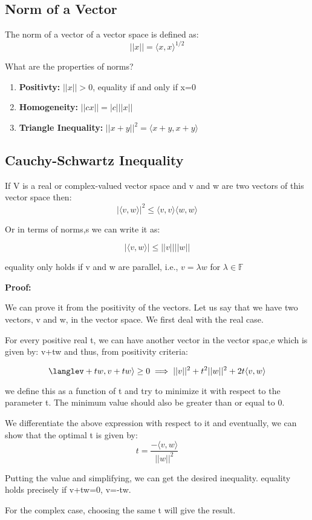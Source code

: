  \subsection{Norm of a Vector}

 The norm of a vector of a vector space is defined as: $$||x||=\langle x,x \rangle ^{1/2}$$

 What are the properties of norms?

 \begin{enumerate}
     \item \textbf{Positivty:} $||x||>0$, equality if and only if x=0
     \item \textbf{Homogeneity:} $||cx||=|c|||x||$
     \item \textbf{Triangle Inequality:} $||x+y||^2=\langle x+y, x+y \rangle$
 \end{enumerate}

 \subsection{Cauchy-Schwartz Inequality}

 If V is a real or complex-valued vector space and v and w are two vectors of this vector space then: $$|\langle v,w\rangle|^2 \leq \langle v,v\rangle \langle w,w \rangle$$

 Or in terms of norms,s we can write it as:

$$|\langle v,w\rangle| \leq ||v|| ||w||$$

equality only holds if v and w are parallel, i.e., $v=\lambda w$ for $\lambda \in \mathbb{F}$
 

 \textbf{Proof:}

We can prove it from the positivity of the vectors. Let us say that we have two vectors, v 
 and w, in the vector space. We first deal with the real case.

 For every positive real t, we can have another vector in the vector spac,e which is given by:
 v+tw and thus, from positivity criteria:

 $$\langlev+tw , v+tw \rangle\geq 0 \implies ||v||^2 + t^2||w||^2 + 2t\langle v,w \rangle $$

 we define this as a function of t and try to minimize it with respect to the parameter t. The minimum value should also be greater than or equal to 0.

 We differentiate the above expression with respect to it and eventually, we can show that the optimal t is given by: 
 $$t = \frac{-\langle v ,w \rangle}{||w||^2}$$

 Putting the value and simplifying, we can get the desired inequality. equality holds precisely if v+tw=0, v=-tw.

 For the complex case, choosing the same t will give the result. 
 

 